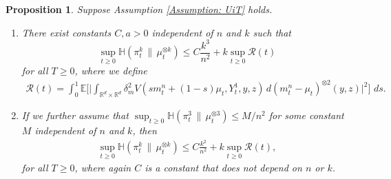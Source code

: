 \documentclass[11pt,reqno]{amsart}
\numberwithin{equation}{section}
\newtheorem{proposition}[theorem]{Proposition}
\theoremstyle{definition}
\def\E{{\mathbb E}}
\def\R{{\mathbb R}}
\newcommand{\ent}{ \mathbb H}
\begin{document}
\begin{proposition}
\label{pr: differential inequality UiT}
Suppose Assumption \ref{Assumption: UiT} holds.  
\begin{enumerate}[(1)]
\item There exist constants $C,a > 0$ independent of $n$ and $k$ such that \begin{equation}
    \label{eq: differential inequality uit suboptimal}
    \sup_{t \ge 0}\ent(\pi^k_t\,\|\,\mu^{\otimes k}_t)\leq C\frac{k^3}{n^2} + k \sup_{t \ge 0}\mathcal R(t) 
\end{equation}
for all $T \ge 0$, where we define
\begin{align*}
    \mathcal R(t) = \int_0^1\E\bigg[\Big|\int_{\R^d\times \R^d} \delta_m^2 V(sm_t^n+(1-s)\mu_t,Y_t^1,y,z)\,d(m_t^n-\mu_t)^{\otimes2}(y,z)\Big|^2\bigg]\,\,ds.
\end{align*}
\item If we further assume that $\sup_{t\geq 0}\ent(\pi^3_t\,\|\,\mu^{\otimes 3}_t)\leq M/n^2$ for some constant $M$ independent of $n$ and $k$, then
\begin{align}
\label{eq: differential inequality uit optimal}
    \sup_{t \ge 0}\ent(\pi^k_t\,\|\,\mu^{\otimes k}_t) \leq C\frac{k^2}{n^2} + k \sup_{t \ge 0}\mathcal R(t) ,
\end{align}
for all $T \ge 0$,
where again $C$ is a constant that does not depend on $n$ or $k$.
\end{enumerate} 
\end{proposition}
\end{document}
